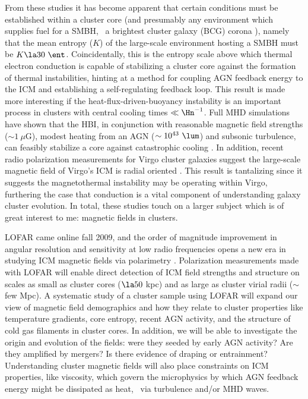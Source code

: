 \documentclass[12pt]{article}
\begin{document}
From these studies it has become apparent that certain conditions must
be established within a cluster core (and presumably any environment
which supplies fuel for a SMBH, \eg\ a brightest cluster galaxy (BCG)
corona \cite{coronae}), namely that the mean entropy ($K$) of the
large-scale environment hosting a SMBH must be $K \la
30~\ent$. Coincidentally, this is the entropy scale above which
thermal electron conduction is capable of stabilizing a cluster core
against the formation of thermal instabilities, hinting at a method
for coupling AGN feedback energy to the ICM and establishing a
self-regulating feedback loop. This result is made more interesting if
the heat-flux-driven-buoyancy instability
\cite[HBI,][]{2008ApJ...677L...9P} is an important process in clusters
with central cooling times $\ll \Hn^{-1}$. Full MHD simulations have
shown that the HBI, in conjunction with reasonable magnetic field
strengths ($\sim 1~\mu$G), modest heating from an AGN ($\sim
10^{43}~\lum$) and subsonic turbulence, can feasibly stabilize a core
against catastrophic cooling \cite{2009ApJ...703...96P,
2009arXiv0911.5198R}. In addition, recent radio polarization
measurements for Virgo cluster galaxies suggest the large-scale
magnetic field of Virgo's ICM is radial oriented
\cite{2009arXiv0911.2476P}. This result is tantalizing since it
suggests the magnetothermal instability \cite{2000ApJ...534..420B} may
be operating within Virgo, furthering the case that conduction is a
vital component of understanding galaxy cluster evolution. In total,
these studies touch on a larger subject which is of great interest to
me: magnetic fields in clusters.

LOFAR came online fall 2009, and the order of magnitude improvement in
angular resolution and sensitivity at low radio frequencies opens a
new era in studying ICM magnetic fields via polarimetry
\cite{2009ASPC..407...33A}. Polarization measurements made with LOFAR
will enable direct detection of ICM field strengths and structure on
scales as small as cluster cores ($\la 50$ kpc) and as large as
cluster virial radii ($\sim$ few Mpc). A systematic study of a cluster
sample using LOFAR will expand our view of magnetic field demographics
and how they relate to cluster properties like temperature gradients,
core entropy, recent AGN activity, and the structure of cold gas
filaments in cluster cores. In addition, we will be able to
investigate the origin and evolution of the fields: were they seeded
by early AGN activity? Are they amplified by mergers? Is there
evidence of draping or entrainment? Understanding cluster magnetic
fields will also place constraints on ICM properties, like viscosity,
which govern the microphysics by which AGN feedback energy might be
dissipated as heat, \eg\ via turbulence and/or MHD waves.
\end{document}
